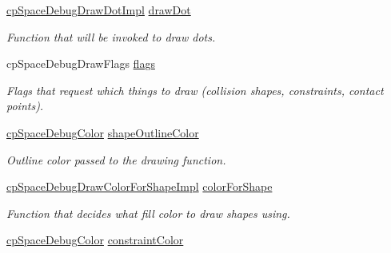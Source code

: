 \begin{DoxyCompactItemize}
\mbox{\label{structcpSpaceDebugDrawOptions_a4003aae132391aa3d57c65f44d61feb3}} 
\hyperlink{group__cpSpace_gadf9a758a2f1c3b53551829573b722e5a}{cp\+Space\+Debug\+Draw\+Dot\+Impl} \hyperlink{structcpSpaceDebugDrawOptions_a4003aae132391aa3d57c65f44d61feb3}{draw\+Dot}
\begin{DoxyCompactList}\small\item\em Function that will be invoked to draw dots. \end{DoxyCompactList}\item 
\mbox{\label{structcpSpaceDebugDrawOptions_a1b4b5128c4b70e3642f49ad71d49159f}} 
cp\+Space\+Debug\+Draw\+Flags \hyperlink{structcpSpaceDebugDrawOptions_a1b4b5128c4b70e3642f49ad71d49159f}{flags}
\begin{DoxyCompactList}\small\item\em Flags that request which things to draw (collision shapes, constraints, contact points). \end{DoxyCompactList}\item 
\mbox{\label{structcpSpaceDebugDrawOptions_a5bc64c5754df1f4bc4b7a789e81555f8}} 
\hyperlink{structcpSpaceDebugColor}{cp\+Space\+Debug\+Color} \hyperlink{structcpSpaceDebugDrawOptions_a5bc64c5754df1f4bc4b7a789e81555f8}{shape\+Outline\+Color}
\begin{DoxyCompactList}\small\item\em Outline color passed to the drawing function. \end{DoxyCompactList}\item 
\mbox{\label{structcpSpaceDebugDrawOptions_a6de88f91bd66ef2f49ca32c3fb6ee145}} 
\hyperlink{group__cpSpace_gaba1fec950f2b58c7c72ab5ca553bdf43}{cp\+Space\+Debug\+Draw\+Color\+For\+Shape\+Impl} \hyperlink{structcpSpaceDebugDrawOptions_a6de88f91bd66ef2f49ca32c3fb6ee145}{color\+For\+Shape}
\begin{DoxyCompactList}\small\item\em Function that decides what fill color to draw shapes using. \end{DoxyCompactList}\item 
\mbox{\label{structcpSpaceDebugDrawOptions_a62271599c7cb15d39f6a2b4620173322}} 
\hyperlink{structcpSpaceDebugColor}{cp\+Space\+Debug\+Color} \hyperlink{structcpSpaceDebugDrawOptions_a62271599c7cb15d39f6a2b4620173322}{constraint\+Color}

\end{DoxyCompactItemize}
